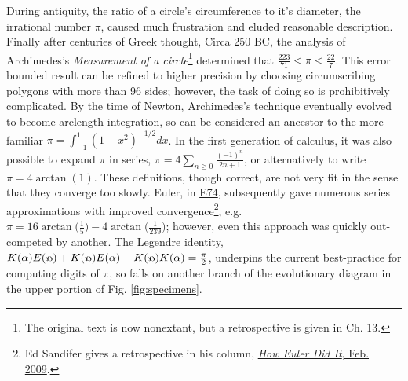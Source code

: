 \documentclass[nofootinbib,preprint]{revtex4-1}
\newcommand{\rev}[1]{\text{\reflectbox{$#1$}}}
\begin{document}
During antiquity, the ratio of a circle's circumference to it's diameter, the irrational number 
$\pi$, caused much frustration and eluded reasonable description. Finally after centuries of Greek 
thought, Circa 250 BC, the analysis of Archimedes's 
\textit{Measurement of a circle}\footnote{The original text is now nonextant, but a retrospective
is given in \cite{AH2001} Ch. 13.} 
determined that $\frac{223}{71}< \pi <\frac{22}{7}$. 
This error bounded result can be refined to higher precision by choosing circumscribing 
polygons with more than 96 sides; however, the task of doing so is prohibitively complicated. 
By the time of Newton, Archimedes's technique eventually evolved to become arclength 
integration, so can be considered an ancestor to the more familiar ${\pi = \int_{-1}^{1} (1-x^2)^{-1/2}dx}$. 
In the first generation of calculus, it was also possible to expand $\pi$ in 
series, $\pi=4\sum_{n\ge0} \frac{(-1)^n}{2n+1}$, or alternatively to write $\pi=4 \arctan(1)$. 
These definitions, though correct, are not very fit in the sense that they converge
too slowly. Euler, in \href{http://eulerarchive.maa.org/pages/E074.html}{E74}, subsequently 
gave numerous series approximations with improved convergence\footnote{Ed Sandifer gives 
a retrospective in his column,  
\href{http://eulerarchive.maa.org/hedi/HEDI-2009-02.pdf}{\textit{How Euler Did It}, Feb. 2009}. }, 
e.g. ${\pi =16\arctan\big(\tfrac{1}{5}\big)-4\arctan\big(\tfrac{1}{239}\big)}$; however, 
even this approach was quickly out-competed by another. The Legendre identity, 
$K(\alpha)E(\rev{\alpha})+K(\rev{\alpha})E(\alpha)-K(\rev{\alpha})K(\alpha)=\frac{\pi}{2}$,
underpins the current best-practice for computing digits of $\pi$, so falls on
another branch of the evolutionary diagram in the upper portion of Fig. \ref{fig:specimens}.
\end{document}
